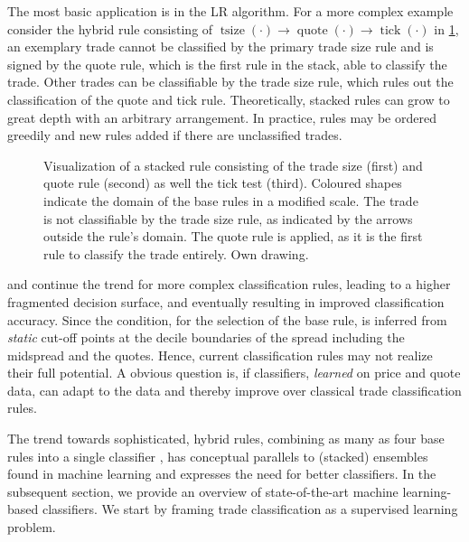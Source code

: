 The most basic application is in the \gls{LR} algorithm. For a more complex example consider the hybrid rule consisting of $\operatorname{tsize}(\cdot) \to \operatorname{quote}(\cdot) \to \operatorname{tick}(\cdot)$ in \cref{fig:stacking-algo}, an exemplary trade cannot be classified by the primary trade size rule and is signed by the quote rule, which is the first rule in the stack, able to classify the trade. Other trades can be classifiable by the trade size rule, which rules out the classification of the quote and tick rule. Theoretically, stacked rules can grow to great depth with an arbitrary arrangement. In practice, rules may be ordered greedily and new rules added if there are unclassified trades.

\begin{figure}[ht!]
\begin{center}
  
\end{center}
\caption[Visualization Of A Stacked Rule]{Visualization of a stacked rule consisting of the trade size (first) and quote rule (second) as well the tick test (third). Coloured shapes indicate the domain of the base rules in a modified scale. The trade is not classifiable by the trade size rule, as indicated by the arrows outside the rule's domain. The quote rule is applied, as it is the first rule to classify the trade entirely. Own drawing.}
\label{fig:stacking-algo}
\end{figure}

\textcite[][3811]{chakrabartyTradeClassificationAlgorithms2007} and \textcite[][18]{grauerOptionTradeClassification2022} continue the trend for more complex classification rules, leading to a higher fragmented decision surface, and eventually resulting in improved classification accuracy. Since the condition, for the selection of the base rule, is inferred from \emph{static} cut-off points at the decile boundaries of the spread including the midspread and the quotes. Hence, current classification rules may not realize their full potential. A obvious question is, if classifiers, \emph{learned} on price and quote data, can adapt to the data and thereby improve over classical trade classification rules.

The trend towards sophisticated, hybrid rules, combining as many as four base rules into a single classifier \autocite[cp.][18]{grauerOptionTradeClassification2022}, has conceptual parallels to (stacked) ensembles found in machine learning and expresses the need for better classifiers. In the subsequent section, we provide an overview of state-of-the-art machine learning-based classifiers. We start by framing trade classification as a supervised learning problem.

